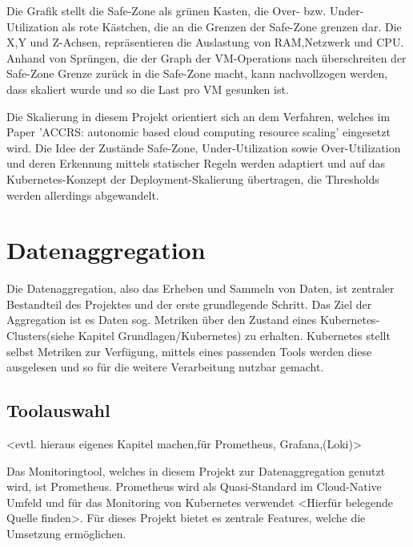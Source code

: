 \documentclass[a4paper,10pt]{scrartcl}
\begin{document}
Die Grafik stellt die Safe-Zone als grünen Kasten, die Over- bzw. Under-Utilization als rote Kästchen, die an die Grenzen der Safe-Zone grenzen dar. Die X,Y und Z-Achsen, repräsentieren die Auslastung von RAM,Netzwerk und CPU. Anhand von Sprüngen, die der Graph der VM-Operations nach überschreiten der Safe-Zone Grenze zurück in die Safe-Zone macht, kann nachvollzogen werden, dass skaliert wurde und so die Last pro VM gesunken ist.

Die Skalierung in diesem Projekt orientiert sich an dem Verfahren, welches im Paper 'ACCRS: autonomic based cloud computing resource scaling' eingesetzt wird. Die Idee der Zustände Safe-Zone, Under-Utilization sowie Over-Utilization und deren Erkennung mittels statischer Regeln werden adaptiert und auf das Kubernetes-Konzept der Deployment-Skalierung übertragen, die Thresholds werden allerdings abgewandelt. 


\pagebreak
\section{Datenaggregation}

Die Datenaggregation, also das Erheben und Sammeln von Daten, ist zentraler Bestandteil des Projektes und der erste grundlegende Schritt. Das Ziel der Aggregation ist es Daten sog. Metriken über den Zustand eines Kubernetes-Clusters(siehe Kapitel Grundlagen/Kubernetes) zu erhalten. Kubernetes stellt selbst Metriken zur Verfügung, mittels eines passenden Tools werden diese ausgelesen und so für die weitere Verarbeitung nutzbar gemacht.

\subsection{Toolauswahl} <evtl. hieraus eigenes Kapitel machen,für Prometheus, Grafana,(Loki)>

Das Monitoringtool, welches in diesem Projekt zur Datenaggregation genutzt wird, ist Prometheus. Prometheus wird als Quasi-Standard im Cloud-Native Umfeld und für das Monitoring von Kubernetes verwendet <Hierfür belegende Quelle finden>. Für dieses Projekt bietet es zentrale Features, welche die Umsetzung ermöglichen.
\end{document}
